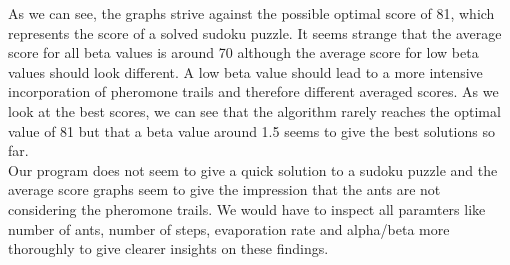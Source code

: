 \documentclass[a4paper]{article}
\begin{document}
\begin{enumerate}
\begin{enumerate}
		As we can see, the graphs strive against the possible optimal score of 81, which represents the score of a solved sudoku puzzle. It seems strange that the average score for all beta values is around 70 although the average score for low beta values should look different. A low beta value should lead to a more intensive incorporation of pheromone trails and therefore different averaged scores. As we look at the best scores, we can see that the algorithm rarely reaches the optimal value of 81 but that a beta value around 1.5 seems to give the best solutions so far.\\
		Our program does not seem to give a quick solution to a sudoku puzzle and the average score graphs seem to give the impression that the ants are not considering the pheromone trails. We would have to inspect all paramters like number of ants, number of steps, evaporation rate and alpha/beta more thoroughly to give clearer insights on these findings.
		
		
	\end{enumerate}
	
\end{enumerate}
\end{document}
